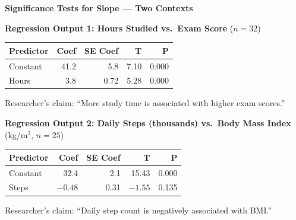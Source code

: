 \documentclass[10pt]{article}
\begin{document}
\namepartnerperiod

\vspace{0.1in}
\textbf{Significance Tests for Slope --- Two Contexts}

\vspace{0.1in}
\textbf{Regression Output 1: Hours Studied vs.\ Exam Score} ($n = 32$)

\begin{center}
\renewcommand{\arraystretch}{1.4}
\begin{tabular}{lrrrr}
    \textbf{Predictor} & \textbf{Coef} & \textbf{SE Coef} & \textbf{T} & \textbf{P} \\
    \hline
    Constant & 41.2 & 5.8 & 7.10 & 0.000 \\
    Hours    &  3.8 & 0.72 & 5.28 & 0.000 \\
\end{tabular}
\end{center}

Researcher's claim: ``More study time is associated with higher exam scores.''

\vspace{0.1in}
\textbf{Regression Output 2: Daily Steps (thousands) vs.\ Body Mass Index} (kg/m$^2$, $n = 25$)

\begin{center}
\renewcommand{\arraystretch}{1.4}
\begin{tabular}{lrrrr}
    \textbf{Predictor} & \textbf{Coef} & \textbf{SE Coef} & \textbf{T} & \textbf{P} \\
    \hline
    Constant & 32.4 &  2.1 & 15.43 & 0.000 \\
    Steps    & $-0.48$ & 0.31 & $-1.55$ & 0.135 \\
\end{tabular}
\end{center}

Researcher's claim: ``Daily step count is negatively associated with BMI.''

\vspace{0.1in}
\end{document}
